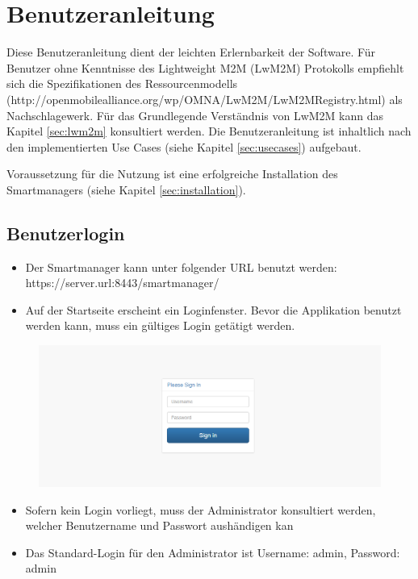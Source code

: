\chapter{Benutzeranleitung}
Diese Benutzeranleitung dient der leichten Erlernbarkeit der Software. Für Benutzer ohne Kenntnisse des Lightweight M2M (LwM2M) Protokolls empfiehlt sich die Spezifikationen des Ressourcenmodells (http://openmobilealliance.org/wp/OMNA/LwM2M/LwM2MRegistry.html) als Nachschlagewerk. Für das Grundlegende Verständnis von LwM2M kann das Kapitel \ref{sec:lwm2m} konsultiert werden. Die Benutzeranleitung ist inhaltlich nach den implementierten Use Cases (siehe Kapitel \ref{sec:usecases}) aufgebaut.

Voraussetzung für die Nutzung ist eine erfolgreiche Installation des Smartmanagers (siehe Kapitel \ref{sec:installation}). 

\section{Benutzerlogin}
\begin{itemize}
\item Der Smartmanager kann unter folgender URL benutzt werden: https://server.url:8443/smartmanager/
\item Auf der Startseite erscheint ein Loginfenster. Bevor die Applikation benutzt werden kann, muss ein gültiges Login getätigt werden.
\end{itemize}

\begin{figure}[H]
\includegraphics[scale=0.57]{../05_Schlussbericht/images/benutzeranleitung/login.png}
\end{figure}
\begin{itemize}
\item Sofern kein Login vorliegt, muss der Administrator konsultiert werden, welcher Benutzername und Passwort aushändigen kan
\item Das Standard-Login für den Administrator ist Username: admin, Password: admin
\end{itemize}
\newpage

